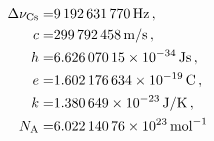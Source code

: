 \documentclass{article}
\begin{document}
\begin{align*}
    \Delta\nu_{\text{Cs}}=& \SI{9 192 631 770}{Hz}\,,\\
    c=&\SI{ 299 792 458 }{m/s}\,,\\
    h=&\SI{ 6.62607015E-34 }{J s}\,,\\
     e=&\SI{1.602 176 634E-19}{C}\,,\\
     k=&\SI{1.380 649E-23}{J/K}\,,\\ 
     N_{\text{A}}=&\SI{6.022 140 76E23}{mol^{-1}}  
\end{align*}
\end{document}
